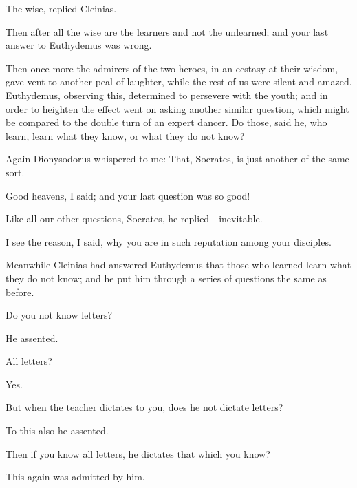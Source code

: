 \documentclass[11pt,letter]{article}
\begin{document}
\par  The wise, replied Cleinias.

\par  Then after all the wise are the learners and not the unlearned; and your last answer to Euthydemus was wrong.

\par  Then once more the admirers of the two heroes, in an ecstasy at their wisdom, gave vent to another peal of laughter, while the rest of us were silent and amazed. Euthydemus, observing this, determined to persevere with the youth; and in order to heighten the effect went on asking another similar question, which might be compared to the double turn of an expert dancer. Do those, said he, who learn, learn what they know, or what they do not know?

\par  Again Dionysodorus whispered to me: That, Socrates, is just another of the same sort.

\par  Good heavens, I said; and your last question was so good!

\par  Like all our other questions, Socrates, he replied—inevitable.

\par  I see the reason, I said, why you are in such reputation among your disciples.

\par  Meanwhile Cleinias had answered Euthydemus that those who learned learn what they do not know; and he put him through a series of questions the same as before.

\par  Do you not know letters?

\par  He assented.

\par  All letters?

\par  Yes.

\par  But when the teacher dictates to you, does he not dictate letters?

\par  To this also he assented.

\par  Then if you know all letters, he dictates that which you know?

\par  This again was admitted by him.
\end{document}
